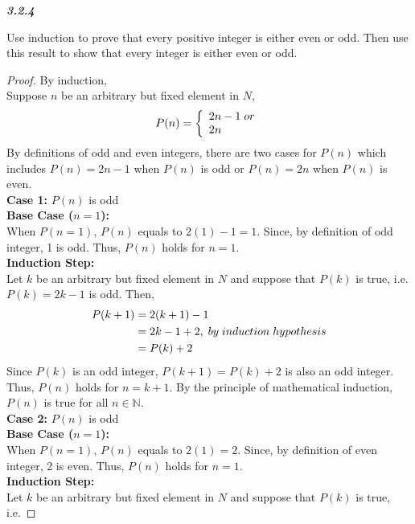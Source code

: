 \documentclass{article}
\begin{document}
\begin{flushleft}
\begin{enumerate}
		\textbf{\textit{3.2.4}}
		\begin{flushleft}
			Use induction to prove that every positive integer is either even or odd. Then use this result to show that every integer is either even or odd.
			\\
			\begin{proof}
				By induction, \\
				Suppose $n$ be an arbitrary but fixed element in $N$,
				\[
					P(n)=\left\{
					\begin{array}{l}
					2n-1 \thickspace or\\
					2n\\
					\end{array}
					\right.
				\]
				By definitions of odd and even integers, there are two cases for $P(n)$ which includes $P(n) = 2n-1$ when $P(n)$ is odd or $P(n) = 2n$ when $P(n)$ is even. 
				\\ \vspace{3mm}
				\textbf{Case 1:} $P(n)$ is odd \\
				\textbf{Base Case ($n = 1$):}
				\\ When $P(n=1)$, $P(n)$ equals to $2(1) - 1 = 1$. Since, by definition of odd integer, 1 is odd. Thus, $P(n)$ holds for $n=1$.
				\\
				\textbf{Induction Step:}
				\\
				Let $k$ be an arbitrary but fixed element in $N$ and suppose that $P(k)$ is true, i.e. 
				$P(k)= 2k-1$ is odd. Then,
				\begin{align*}
					P(k+1) & = 2(k+1) -1 \\
					& = 2k - 1 + 2 , \thickspace by \thickspace induction \thickspace hypothesis\\
					& = P(k) + 2
				\end{align*}
				Since $P(k)$ is an odd integer, $P(k+1) = P(k)+2$ is also an odd integer. Thus, $P(n)$ holds for $n=k+1$. 
				By the principle of mathematical induction, $P(n)$ is true for all $n \in \mathbb{N}$.
				\\ \vspace{3mm}
				\textbf{Case 2:} $P(n)$ is odd \\
				\textbf{Base Case ($n = 1$):}
				\\ When $P(n=1)$, $P(n)$ equals to $2(1) = 2$. Since, by definition of even integer, 2 is even. Thus, $P(n)$ holds for $n=1$.
				\\
				\textbf{Induction Step:}
				\\
				Let $k$ be an arbitrary but fixed element in $N$ and suppose that $P(k)$ is true, i.e. 

\end{proof}
\end{flushleft}
\end{enumerate}
\end{flushleft}
\end{document}
